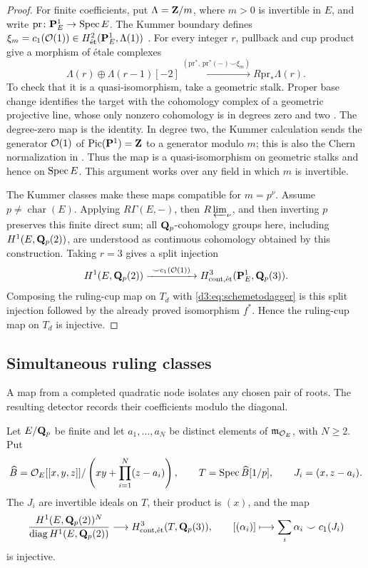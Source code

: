 \begin{proof}
For finite coefficients, put $\Lambda=\mathbf Z/m$, where $m>0$ is
invertible in $E$, and write
$\mathrm{pr}\colon\mathbf P^1_E\to\operatorname{Spec} E$.
The Kummer boundary defines
$\xi_m=c_1(\mathcal O(1))\in H^2_{\mathrm{\acute et}}(\mathbf P^1_E,\Lambda(1))$
\cite[Example~7.9(a)]{MilneEtale}.
For every integer $r$, pullback and cup product give a morphism
of \'etale complexes
\begin{equation}\label{d3:eq:finitePonebundle}
 \Lambda(r)\oplus\Lambda(r-1)[-2]
 \xrightarrow{(\mathrm{pr}^*,\,\mathrm{pr}^*(-)\smile\xi_m)}
 R\mathrm{pr}_*\Lambda(r).
\end{equation}
To check that it is a quasi-isomorphism, take a geometric stalk.
Proper base change identifies the target with the cohomology
complex of a geometric projective line, whose only nonzero
cohomology is in degrees zero and two
\cite[Proposition~14.2 and Theorems~17.7 and~17.10]{MilneEtale}.
The degree-zero map is the identity.
In degree two, the Kummer calculation sends the generator
$\mathcal O(1)$ of $\operatorname{Pic}(\mathbf P^1)=\mathbf Z$ to a generator modulo $m$;
this is also the Chern normalization in
\cite[Theorems~23.2 and~23.3(b)]{MilneEtale}.
Thus the map is a quasi-isomorphism on geometric stalks and
hence on $\operatorname{Spec} E$. This argument works over any field in
which $m$ is invertible.

The Kummer classes make these maps compatible for $m=p^\nu$.
Assume $p\ne\operatorname{char}(E)$.
Applying $R\Gamma(E,-)$, then $R\varprojlim_\nu$, and then
inverting $p$ preserves this finite direct sum; all
$\mathbf Q_p$-cohomology groups here, including $H^1(E,\mathbf Q_p(2))$,
are understood as continuous cohomology obtained by this
construction. Taking $r=3$ gives a split injection
\[
 H^1(E,\mathbf Q_p(2))
 \xrightarrow{\ \smile c_1(\mathcal O(1))\ }
 H^3_{\mathrm{cont},\mathrm{\acute et}}(\mathbf P^1_E,\mathbf Q_p(3)).
\]
Composing the ruling-cup map on $T_d$ with
\eqref{d3:eq:schemetodagger} is this split injection followed
by the already proved isomorphism $f^*$.
Hence the ruling-cup map on $T_d$ is injective.
\end{proof}

\subsection{Simultaneous ruling classes}
A map from a completed quadratic node isolates any chosen pair of roots.
The resulting detector records their coefficients modulo the diagonal.

\begin{lemma}\label{d3:lem:completedrootcup}\label{d3:lem:completedtamecup}
Let $E/\mathbf Q_p$ be finite and let $a_1,\ldots,a_N$ be distinct elements of $\mathfrak m_{\mathcal O_E}$, with $N\geq2$. Put
\[
\widehat B=\mathcal O_E[[x,y,z]]/
\left(xy+\prod_{i=1}^N(z-a_i)\right),
\qquad T=\operatorname{Spec}\widehat B[1/p],
\qquad J_i=(x,z-a_i).
\]
The $J_i$ are invertible ideals on $T$, their product is $(x)$, and the map
\begin{equation}\label{d3:eq:completedtamecup}
\frac{H^1(E,\mathbf Q_p(2))^N}
{\operatorname{diag}H^1(E,\mathbf Q_p(2))}
\longrightarrow H^3_{\mathrm{cont},\mathrm{\acute et}}(T,\mathbf Q_p(3)),
\qquad
[(\alpha_i)]\longmapsto\sum_i\alpha_i\smile c_1(J_i)
\end{equation}
is injective.
\end{lemma}

